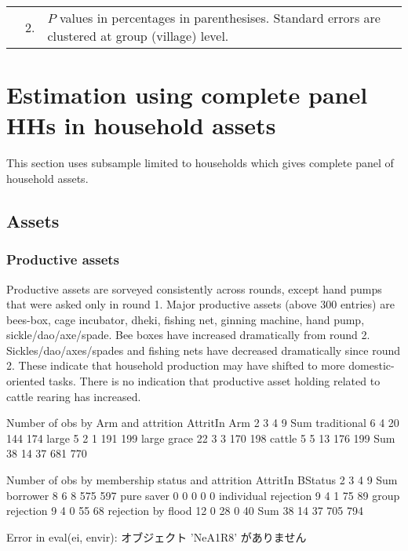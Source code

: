 \begin{minipage}[t]{14cm}
\begin{tabular}{>{\hfill\scriptsize}p{1cm}<{}>{\hfill\scriptsize}p{.25cm}<{}>{\scriptsize}p{12cm}<{\hfill}}
& 2. & $P$ values in percentages in parenthesises. Standard errors are clustered at group (village) level.
\end{tabular}
\end{minipage}




\section{Estimation using complete panel HHs in household assets}


This section uses subsample limited to households which gives complete panel of household assets. 

\subsection{Assets}

\subsubsection{Productive assets}


Productive assets are sorveyed consistently across rounds, except hand pumps that were asked only in round 1. Major productive assets (above 300 entries) are bees-box, cage incubator, dheki, fishing net, ginning machine, hand pump, sickle/dao/axe/spade. Bee boxes have increased dramatically from round 2. Sickles/dao/axes/spades and fishing nets have decreased dramatically since round 2. These indicate that household production may have shifted to more domestic-oriented tasks. There is no indication that productive asset holding related to cattle rearing has increased.


\begin{Schunk}
\begin{Soutput}


Number of obs by Arm and attrition
             AttritIn
Arm             2   3   4   9 Sum
  traditional   6   4  20 144 174
  large         5   2   1 191 199
  large grace  22   3   3 170 198
  cattle        5   5  13 176 199
  Sum          38  14  37 681 770


Number of obs by membership status and attrition
                      AttritIn
BStatus                  2   3   4   9 Sum
  borrower               8   6   8 575 597
  pure saver             0   0   0   0   0
  individual rejection   9   4   1  75  89
  group rejection        9   4   0  55  68
  rejection by flood    12   0  28   0  40
  Sum                   38  14  37 705 794
\end{Soutput}
\begin{Soutput}
Error in eval(ei, envir):  オブジェクト 'NeA1R8' がありません 
\end{Soutput}
\end{Schunk}





